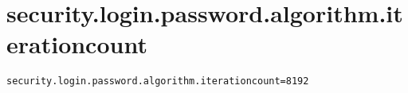 \section{security.login.password.algorithm.iterationcount}
\label{configuration:SecurityLoginPasswordAlgorithmIterationcount}
\AvailableInJavaOnly{\TODO}
\begin{lstlisting}[style=Props,caption={Usage example for \textit{security.login.password.algorithm.iterationcount}}]
security.login.password.algorithm.iterationcount=8192
\end{lstlisting}